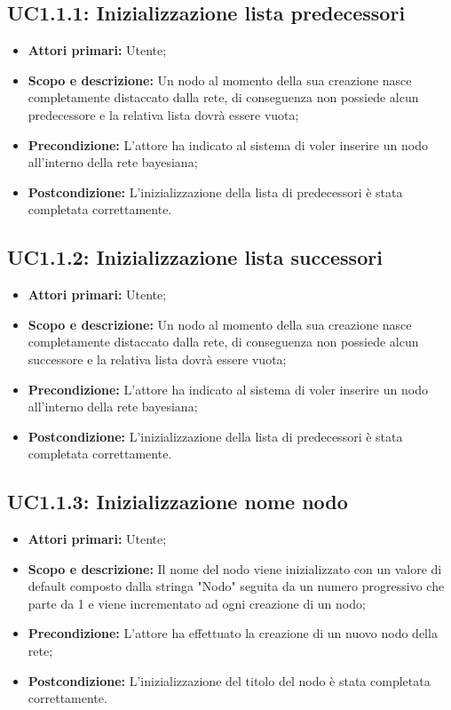 \subsection{UC1.1.1: Inizializzazione lista predecessori} 
\begin{itemize} 
	\item{\textbf{Attori primari:} Utente;} 
	\item{\textbf{Scopo e descrizione:} Un nodo al momento della sua creazione nasce completamente distaccato dalla rete, di conseguenza non possiede alcun predecessore e la relativa lista dovrà essere vuota;} 
	\item{\textbf{Precondizione:} L'attore ha indicato al sistema di voler inserire un nodo all'interno della rete bayesiana;} 
	\item{\textbf{Postcondizione:} L'inizializzazione della lista di predecessori è stata completata correttamente.} 
\end{itemize} 
\subsection{UC1.1.2: Inizializzazione lista successori} 
\begin{itemize} 
	\item{\textbf{Attori primari:} Utente;} 
	\item{\textbf{Scopo e descrizione:} Un nodo al momento della sua creazione nasce completamente distaccato dalla rete, di conseguenza non possiede alcun successore e la relativa lista dovrà essere vuota;} 
	\item{\textbf{Precondizione:} L'attore ha indicato al sistema di voler inserire un nodo all'interno della rete bayesiana;} 
	\item{\textbf{Postcondizione:} L'inizializzazione della lista di predecessori è stata completata correttamente.} 
\end{itemize} 
\subsection{UC1.1.3: Inizializzazione nome nodo} 
\begin{itemize} 
	\item{\textbf{Attori primari:} Utente;} 
	\item{\textbf{Scopo e descrizione:} Il nome del nodo viene inizializzato con un valore di default composto dalla stringa "Nodo" seguita da un numero progressivo che parte da 1 e viene incrementato ad ogni creazione di un nodo;} 
	\item{\textbf{Precondizione:} L'attore ha effettuato la creazione di un nuovo nodo della rete;} 
	\item{\textbf{Postcondizione:} L'inizializzazione del titolo del nodo è stata completata correttamente.} 
\end{itemize} 

